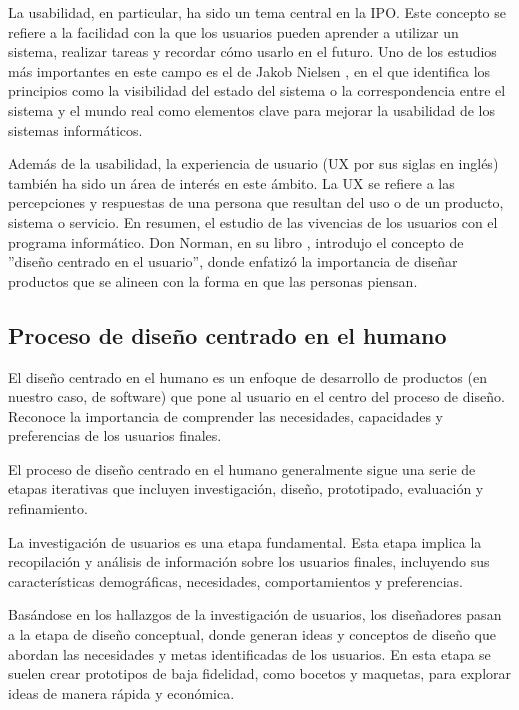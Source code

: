 La usabilidad, en particular, ha sido un tema central en la IPO. Este concepto se refiere a la facilidad con la que los usuarios pueden aprender a utilizar un sistema, realizar tareas y recordar cómo usarlo en el futuro. Uno de los estudios más importantes en este campo es el de Jakob Nielsen \cite{nielsen1994usability}, en el que identifica los principios como la visibilidad del estado del sistema o la correspondencia entre el sistema y el mundo real como elementos clave para mejorar la usabilidad de los sistemas informáticos.

Además de la usabilidad, la experiencia de usuario (UX por sus siglas en inglés) también ha sido un área de interés en este ámbito. La UX se refiere a las percepciones y respuestas de una persona que resultan del uso o de un producto, sistema o servicio. En resumen, el estudio de las vivencias de los usuarios con el programa informático. Don Norman, en su libro \cite{norman2013design}, introdujo el concepto de ''diseño centrado en el usuario'', donde enfatizó la importancia de diseñar productos que se alineen con la forma en que las personas piensan.

\subsection{Proceso de diseño centrado en el humano}

El diseño centrado en el humano es un enfoque de desarrollo de productos (en nuestro caso, de software) que pone al usuario en el centro del proceso de diseño. Reconoce la importancia de comprender las necesidades, capacidades y preferencias de los usuarios finales.

El proceso de diseño centrado en el humano generalmente sigue una serie de etapas iterativas que incluyen investigación, diseño, prototipado, evaluación y refinamiento.

La investigación de usuarios es una etapa fundamental. Esta etapa implica la recopilación y análisis de información sobre los usuarios finales, incluyendo sus características demográficas, necesidades, comportamientos y preferencias.

Basándose en los hallazgos de la investigación de usuarios, los diseñadores pasan a la etapa de diseño conceptual, donde generan ideas y conceptos de diseño que abordan las necesidades y metas identificadas de los usuarios. En esta etapa se suelen crear prototipos de baja fidelidad, como bocetos y maquetas, para explorar ideas de manera rápida y económica.

